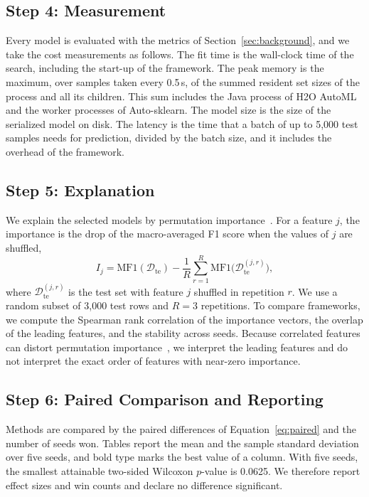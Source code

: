 \subsection{Step 4: Measurement}
Every model is evaluated with the metrics of Section~\ref{sec:background}, and we take the cost measurements as follows. The fit time is the wall-clock time of the search, including the start-up of the framework. The peak memory is the maximum, over samples taken every 0.5\,s, of the summed resident set sizes of the process and all its children. This sum includes the Java process of H2O AutoML and the worker processes of Auto-sklearn. The model size is the size of the serialized model on disk. The latency is the time that a batch of up to 5,000 test samples needs for prediction, divided by the batch size, and it includes the overhead of the framework.

\subsection{Step 5: Explanation}
We explain the selected models by permutation importance~\cite{altmann2010}. For a feature $j$, the importance is the drop of the macro-averaged F1 score when the values of $j$ are shuffled,
\begin{equation}
I_j=\mathrm{MF1}(\mathcal{D}_{\mathrm{te}})-\frac{1}{R}\sum_{r=1}^{R}\mathrm{MF1}\big(\mathcal{D}^{(j,r)}_{\mathrm{te}}\big),
\label{eq:pfi}
\end{equation}
where $\mathcal{D}^{(j,r)}_{\mathrm{te}}$ is the test set with feature $j$ shuffled in repetition $r$. We use a random subset of 3,000 test rows and $R=3$ repetitions. To compare frameworks, we compute the Spearman rank correlation of the importance vectors, the overlap of the leading features, and the stability across seeds. Because correlated features can distort permutation importance~\cite{strobl2008}, we interpret the leading features and do not interpret the exact order of features with near-zero importance.

\subsection{Step 6: Paired Comparison and Reporting}
Methods are compared by the paired differences of Equation~\eqref{eq:paired} and the number of seeds won. Tables report the mean and the sample standard deviation over five seeds, and bold type marks the best value of a column. With five seeds, the smallest attainable two-sided Wilcoxon $p$-value is 0.0625. We therefore report effect sizes and win counts and declare no difference significant.
